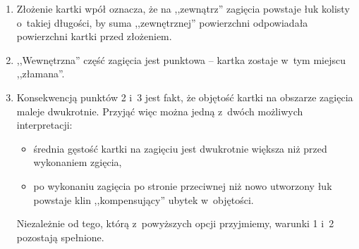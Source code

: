 	 \begin{enumerate}
		\item Złożenie kartki wpół oznacza, że na ,,zewnątrz'' zagięcia 
		powstaje łuk kolisty o~takiej długości, by suma ,,zewnętrznej'' 
		powierzchni odpowiadała powierzchni kartki przed złożeniem.
		\item ,,Wewnętrzna'' część zagięcia jest punktowa -- kartka zostaje w~tym miejscu ,,złamana''.  
		\item Konsekwencją punktów 2 i~3 jest fakt, że objętość kartki 
		na obszarze zagięcia maleje dwukrotnie. Przyjąć więc można jedną 
		z~dwóch możliwych interpretacji:
		\begin{itemize}
			\item średnia gęstość kartki na zagięciu jest dwukrotnie 
			większa niż przed wykonaniem zgięcia,
			\item po wykonaniu zagięcia po stronie przeciwnej niż 
			nowo utworzony łuk powstaje klin ,,kompensujący'' ubytek 
			w~objętości.\vspace*{1pt}
		\end{itemize}
		Niezależnie od tego, którą z~powyższych opcji przyjmiemy, 
		warunki 1 i~2 pozostają spełnione.
	\end{enumerate}
	
